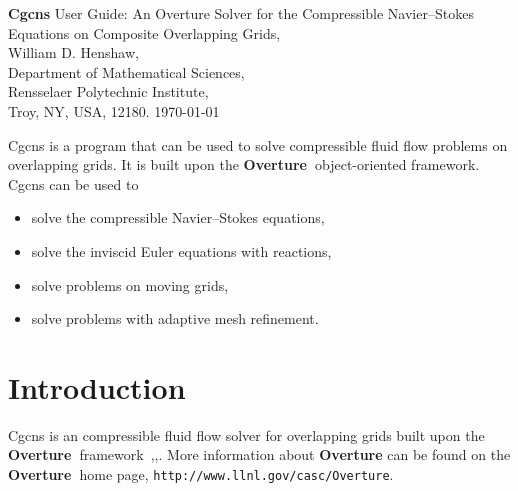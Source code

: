 \documentclass{article}
\newcommand{\Overture}{{\bf Overture\ }}
\begin{document}


\def\ud     {{    U}}
\def\pd     {{    P}}

\newcommand{\mbar}{\bar{m}}
\newcommand{\Rbar}{\bar{R}}
\newcommand{\Ru}{R_u}         %
\newcommand{\Div}{\grad\cdot}
\newcommand{\tauv}{\boldsymbol{\tau}}
\newcommand{\sumi}{\sum_{i=1}^n}
\newcommand{\dt}{{\Delta t}}

\baselineskip
\begin{flushleft}
{\Large
{\bf Cgcns} User Guide: An Overture Solver for the Compressible Navier--Stokes Equations on Composite Overlapping Grids,\\
}
\vspace{2\baselineskip}
William D. Henshaw,\\
Department of Mathematical Sciences, \\
Rensselaer Polytechnic Institute, \\
Troy, NY, USA, 12180.
\vspace{\baselineskip}
\today\\

\vspace{4\baselineskip}


   Cgcns is a program that can be used to solve compressible fluid flow problems on overlapping
grids. It is built upon the \Overture object-oriented framework. 
Cgcns can be used to 
\begin{itemize}
  \item solve the compressible Navier--Stokes equations,
  \item solve the inviscid Euler equations with reactions, 
  \item solve problems on moving grids, 
  \item solve problems with adaptive mesh refinement.
\end{itemize} 

\end{flushleft}

\clearpage
\tableofcontents

\clearpage
\section{Introduction}

Cgcns is an compressible fluid flow solver for overlapping grids built upon
the \Overture framework~\cite{Brown97},\cite{Henshaw96a},\cite{iscope97}.
More information about
{\bf Overture} can be found on the \Overture home page, {\tt http://www.llnl.gov/\-casc/\-Overture}.
\end{document}
